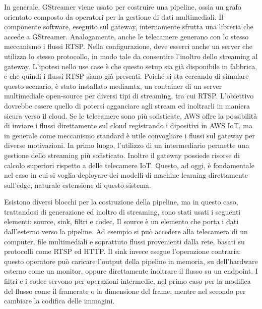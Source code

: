 In generale, GStreamer viene usato per costruire una pipeline, ossia un grafo orientato composto da operatori per la gestione di dati multimediali. Il componente software, eseguito sul gateway, internamente sfrutta una libreria che accede a GStreamer. %
Analogamente, anche le telecamere generano con lo stesso meccanismo i flussi RTSP. Nella configurazione, deve esserci anche un server che utilizza lo stesso protocollo, in modo tale da consentire l'inoltro dello streaming al gateway. L'ipotesi nello use case è che questo setup sia già disponibile in fabbrica, e che quindi i flussi RTSP siano già presenti. Poiché si sta cercando di simulare questo scenario, è stato installato mediamtx, un container di un server multimediale open-source per diversi tipi di streaming, tra cui RTSP. L'obiettivo dovrebbe essere quello di potersi agganciare agli stream ed inoltrarli in maniera sicura verso il cloud. Se le telecamere sono più sofisticate, AWS offre la possibilità di inviare i flussi direttamente sul cloud registrando i dipositivi in AWS IoT, ma in generale come meccanismo standard è utile convogliare i flussi sul gateway per diverse motivazioni. In primo luogo, l'utilizzo di un intermediario permette una gestione dello streaming più sofisticato. Inoltre il gateway possiede risorse di calcolo superiori rispetto a delle telecamere IoT. Questo, ad oggi, è fondamentale nel caso in cui si voglia deployare dei modelli di machine learning direttamente sull'edge, naturale estensione di questo sistema.

Esistono diversi blocchi per la costruzione della pipeline, ma in questo caso, trattandosi di generazione ed inoltro di streaming, sono stati usati i seguenti elementi: source, sink, filtri e codec. Il source è un elemento che porta i dati dall'esterno verso la pipeline. Ad esempio si può accedere alla telecamera di un computer, file multimediali e soprattuto flussi provenienti dalla rete, basati su protocolli come RTSP ed HTTP. Il sink invece esegue l'operazione contraria: questo operatore può caricare l'output della pipeline in memoria, su dell'hardware esterno come un monitor, oppure direttamente inoltrare il flusso su un endpoint. I filtri e i codec servono per operazioni intermedie, nel primo caso per la modifica del flusso come il framerate o la dimensione del frame, mentre nel secondo per cambiare la codifica delle immagini. 



